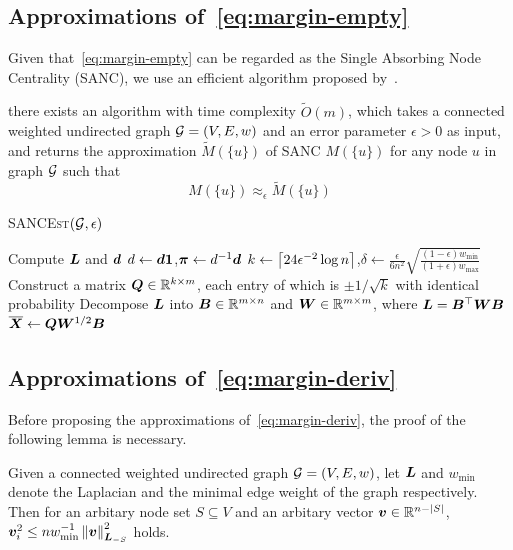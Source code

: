 \documentclass[sigconf]{acmart}
\begin{document}
\subsection{Approximations of~\eqref{eq:margin-empty}}\label{subsec:approx-margin-empty}

Given that~\eqref{eq:margin-empty} can be regarded as the Single Absorbing Node Centrality (SANC), we use an efficient algorithm proposed by~\cite{ZhXuZh20}.
\begin{lemma}\label{lem:approxhk}
    there exists an algorithm with time complexity \(\tilde{O}(m)\), which takes a connected weighted undirected graph \(\mathcal{G}=(V,E,w)\) and an error parameter \(\epsilon>0\) as input, and returns the approximation \(\tilde{M}(\{u\})\) of SANC \(M(\{u\})\) for any node \(u\) in graph \(\mathcal{G}\) such that
    \[M(\{u\})\approx_\epsilon\tilde{M}(\{u\})\]
\end{lemma}

\begin{algorithm}
    \caption{\textsc{SANCEst}\((\mathcal{G},\epsilon)\)}
    \label{algo:sancest}
    Compute \(\boldsymbol{L}\) and \(\boldsymbol{d}\)\;
    \(d\gets\boldsymbol{d}\boldsymbol{1}\),\(\boldsymbol{\pi}\gets d^{-1}\boldsymbol{d}\)\;
    \(k\gets\left\lceil24\epsilon^{-2}\log n\right\rceil\),\(\delta\gets\frac{\epsilon}{6n^2}\sqrt{\frac{(1-\epsilon)w_{\min}}{(1+\epsilon)w_{\max}}}\)\;
    Construct a matrix \(\boldsymbol{Q}\in\mathbb{R}^{k\times m}\), each entry of which is \(\pm1/\sqrt k\) with identical probability\;
    Decompose \(\boldsymbol{L}\) into \(\boldsymbol{B}\in\mathbb{R}^{m\times n}\) and \(\boldsymbol{W}\in\mathbb{R}^{m\times m}\), where \(\boldsymbol{L}=\boldsymbol{B}^\top\boldsymbol{W}\boldsymbol{B}\)\;
    \(\overline{\boldsymbol{X}}\gets\boldsymbol{Q}\boldsymbol{W}^{1/2}\boldsymbol{B}\)\;

\end{algorithm}

\subsection{Approximations of~\eqref{eq:margin-deriv}}

Before proposing the approximations of~\eqref{eq:margin-deriv}, the proof of the following lemma is necessary.
\begin{lemma}\label{lem:norm-ineq}
    Given a connected weighted undirected graph \(\mathcal{G}=(V,E,w)\), let \(\boldsymbol{L}\) and \(w_{\min}\) denote the Laplacian and the minimal edge weight of the graph respectively.
    Then for an arbitary node set \(S\subseteq V\) and an arbitary vector \(\boldsymbol{v}\in\mathbb{R}^{n-\left|S \right|}\), \(\boldsymbol{v}_i^2\le nw_{\min}^{-1}\left\Vert\boldsymbol{v}\right\Vert^2_{\boldsymbol{L}_{-S}}\) holds.
\end{lemma}
\end{document}
